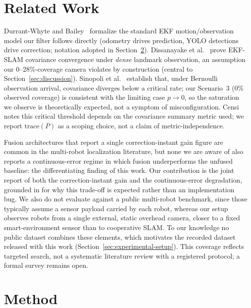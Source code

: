 \documentclass[runningheads]{llncs}
\begin{document}
\section{Related Work}
\label{sec:related-work}

Durrant-Whyte and Bailey~\cite{bailey2006slam} formalize the standard EKF
motion/observation model our filter follows directly (odometry drives
prediction, YOLO detections drive correction; notation adopted in
Section~\ref{sec:methodology}). Dissanayake et
al.~\cite{dissanayake2001slam} prove EKF-SLAM covariance convergence
under \emph{dense} landmark observation, an assumption our
0--28\%-coverage camera violates by construction (central to
Section~\ref{sec:discussion}). Sinopoli et
al.~\cite{sinopoli2004intermittent} establish that, under Bernoulli
observation arrival, covariance diverges below a critical rate; our
Scenario~3 (0\% observed coverage) is consistent with the limiting
case $p\to0$, so the saturation we observe is theoretically expected,
not a symptom of misconfiguration. Censi~\cite{censi2009geometric} notes this critical
threshold depends on the covariance summary metric used; we report
$\mathrm{trace}(P)$ as a scoping choice, not a claim of
metric-independence.

Fusion architectures that report a single correction-instant gain
figure are common in the multi-robot localization literature, but none
we are aware of also reports a continuous-error regime in which fusion
underperforms the unfused baseline: the differentiating finding of
this work. Our contribution is the joint report of both the
correction-instant gain and the continuous-error degradation, grounded
in \cite{sinopoli2004intermittent,censi2009geometric} for why this
trade-off is expected rather than an implementation bug. We also do
not evaluate against a public multi-robot benchmark, since those
typically assume a sensor payload carried by each robot, whereas our
setup observes robots from a single external, static overhead camera,
closer to a fixed smart-environment sensor than to cooperative SLAM.
To our knowledge no public dataset combines these elements, which
motivates the recorded dataset released with this work
(Section~\ref{sec:experimental-setup}). This coverage reflects
targeted search, not a systematic literature review with a registered
protocol; a formal survey remains open.

\section{Method}
\label{sec:methodology}
\end{document}
